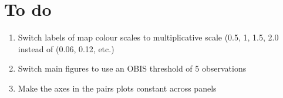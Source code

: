 \documentclass[11pt]{article}
\begin{document}
\clearpage
\section{To do}
\begin{enumerate}

\item  Switch labels of map colour scales to multiplicative scale (0.5, 1, 1.5, 2.0 instead of (0.06, 0.12, etc.)
\item Switch main figures to use an OBIS threshold of 5 observations
\item Make the axes in the pairs plots constant across panels

\end{enumerate}
\end{document}
